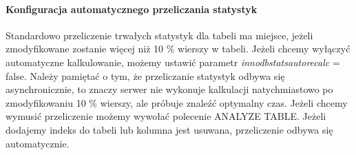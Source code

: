 \paragraph{Konfiguracja automatycznego przeliczania statystyk}
Standardowo przeliczenie trwałych statystyk dla tabeli ma miejsce, jeżeli zmodyfikowane zostanie więcej niż 10 \% wierszy w tabeli. Jeżeli chcemy wyłączyć automatyczne kalkulowanie, możemy ustawić parametr \textit{innodb\textunderscore stats\textunderscore auto\textunderscore recalc} = false. Należy pamiętać o tym, że przeliczanie statystyk odbywa się asynchronicznie, to znaczy serwer nie wykonuje kalkulacji natychmiastowo po zmodyfikowaniu 10 \% wierszy, ale próbuje znaleźć optymalny czas. Jeżeli chcemy wymusić przeliczenie możemy wywołać polecenie ANALYZE TABLE. Jeżeli dodajemy indeks do tabeli lub kolumna jest usuwana, przeliczenie odbywa się automatycznie.

